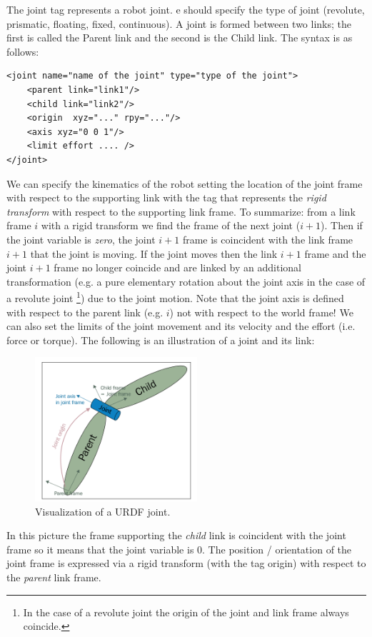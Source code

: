 \documentclass[11pt]{article}
\begin{document}
The joint tag represents a robot joint. e should specify the type of joint (revolute, prismatic, floating, fixed, continuous).  
A  joint is formed between two links; the first is called the Parent link
and the second is the Child link. The syntax is as follows:

\begin{Verbatim}	
<joint name="name of the joint" type="type of the joint">
	<parent link="link1"/>
	<child link="link2"/>
	<origin  xyz="..." rpy="..."/>
	<axis xyz="0 0 1"/>
	<limit effort .... />
</joint>
\end{Verbatim}

We can specify the kinematics of the robot setting the location of the joint frame with respect to the supporting link with the tag  that represents the \textit{rigid transform} with respect to the supporting link frame. To summarize: from a link frame $i$ with a rigid transform we find the frame of the next joint ($i+1$). Then if the joint variable  is \textit{zero}, the joint $i+1$ frame is coincident with the link frame $i+1$ that the joint is moving. If the joint moves  then the link $i+1$ frame and the joint $i+1$ frame no longer coincide and are linked by an additional transformation (e.g. a pure elementary rotation about the joint axis in the  case of a revolute joint \footnote{In the case of a revolute joint the origin of the joint and link frame always coincide.}) due to the joint motion. Note that the joint axis is defined with respect to the parent link (e.g. $i$) not with respect to the world frame!
We can also set the limits of the joint movement and
its velocity and the effort (i.e. force or torque).
 The following is an illustration of a joint and
its link:

\begin{figure}[H]
	\centering
	\includegraphics[width=6cm]{pics/joint.png}
	\caption{Visualization of a URDF joint.}
	\label{fig:link}
\end{figure}

In this picture the frame supporting the \textit{child} link is coincident with the joint frame so it means that the joint variable is 0.
The position / orientation of the joint frame is expressed via a rigid transform (with the tag origin) with  respect to the \textit{parent} link frame. 
\\
\end{document}
